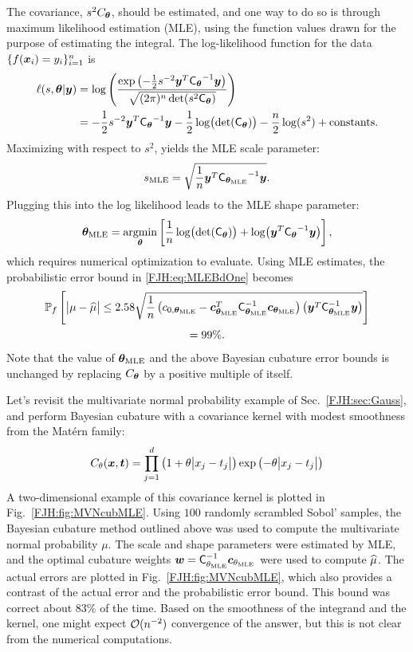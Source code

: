 \documentclass[graybox,footinfo]{svmult}
\begin{document}
The covariance, $s^2 C_{{\boldsymbol{\theta}}}$, should be estimated, and one way to do so is 
through 
maximum likelihood estimation (MLE), using the function values drawn for the purpose of 
estimating the integral.  The log-likelihood function for the data $ \{f({\boldsymbol{x}}_i )= 
y_i\}_{i=1}^n$ is
\begin{align*}
\ell(s,{\boldsymbol{\theta}} | {\boldsymbol{y}}) & = \log \left(\frac{\exp\left(- \frac 12 s^{-2} {\boldsymbol{y}}^T 
\mathsf{C_{{\boldsymbol{\theta}}}}^{-1} {\boldsymbol{y}}\right)}{\sqrt{(2\pi)^n  \det(s^2 
\mathsf{C_{{\boldsymbol{\theta}}}})}}\right)\\
& = - \frac 12 s^{-2} {\boldsymbol{y}}^T \mathsf{C_{{\boldsymbol{\theta}}}}^{-1} {\boldsymbol{y}} -\frac 12  
\log \bigl(
\det(\mathsf{C_{{\boldsymbol{\theta}}}}) \bigr) - \frac n2 \log(s^2) + \text{constants}.
\end{align*}
Maximizing with respect to $s^2$, yields the MLE scale parameter:
\[
s_{\text{MLE}} =  \sqrt{\frac 1n {\boldsymbol{y}}^T \mathsf{C_{{\boldsymbol{\theta}}_{\text{MLE}}}}^{-1} {\boldsymbol{y}}}.
\]
Plugging this into the log likelihood leads to the MLE shape parameter: 
\[
{\boldsymbol{\theta}}_{\text{MLE}} =  \operatorname*{argmin}_{\boldsymbol{\theta}} \left[\frac 1n \log \bigl(\det(\mathsf{C_{{\boldsymbol{\theta}}}}) 
\bigr) 
+ \log\bigl({\boldsymbol{y}}^T \mathsf{C_{{\boldsymbol{\theta}}}}^{-1} {\boldsymbol{y}} \bigr)  \right ],
\]
which requires numerical optimization to evaluate. Using MLE estimates, the probabilistic 
error 
bound in \eqref{FJH:eq:MLEBdOne} becomes
\begin{multline} \label{FJH:eq:MLEBdTwo}
\bbP_f\left[\abs{\mu - \hmu} \le 2.58 
\sqrt{\frac 1n \left(c_{0,\bstheta_\MLE} - \bsc_{\bstheta_\MLE} ^T 
	\mC_{\bstheta_\MLE}^{-1} \bsc_{\bstheta_\MLE} \right)  \left(\bsy^T 
	\mathsf{C}_{\bstheta_\MLE}^{-1} \bsy\right)}\right] \\
 = 99\%.
\end{multline}
Note that the value of ${\boldsymbol{\theta}}_{\text{MLE}}$ and the above Bayesian cubature error bounds  
is unchanged by replacing  $C_{\boldsymbol{\theta}}$ by a positive multiple of itself.  

Let's revisit the multivariate normal probability example of Sec.\ \ref{FJH:sec:Gauss}, 
and perform Bayesian cubature with a covariance kernel with modest smoothness from 
the Mat\'ern  family:
\begin{equation} \label{FJH:eq:Matern}
C_\theta(\bsx,\bst) = \prod_{j=1}^d \left(1 + 
\theta\abs{x_j-t_j}\right) \exp\left(-\theta\abs{x_j-t_j}\right)
\end{equation}
A two-dimensional example of this covariance kernel is plotted in Fig.\ 
\ref{FJH:fig:MVNcubMLE}.  Using $100$ randomly scrambled Sobol' samples, the 
Bayesian 
cubature method outlined above was used to compute the multivariate normal probability 
$\mu$.  The scale and shape parameters were estimated by MLE, and the optimal 
cubature weights ${\boldsymbol{w}} = 
\mathsf{C}_{\theta_{\text{MLE}}}^{-1} {\boldsymbol{c}}_{\theta_{\text{MLE}}}$ were used to compute $\widehat{\mu}$.  
The actual errors are plotted in Fig.\ \ref{FJH:fig:MVNcubMLE}, which also provides a 
contrast of the actual error and the probabilistic error bound.  This bound was correct 
about $83\%$ of the time.  Based on the smoothness of the integrand and the kernel, 
one might expect ${\mathcal{O}}(n^{-2})$ convergence of the answer, but this is not clear from 
the numerical computations.
\end{document}
